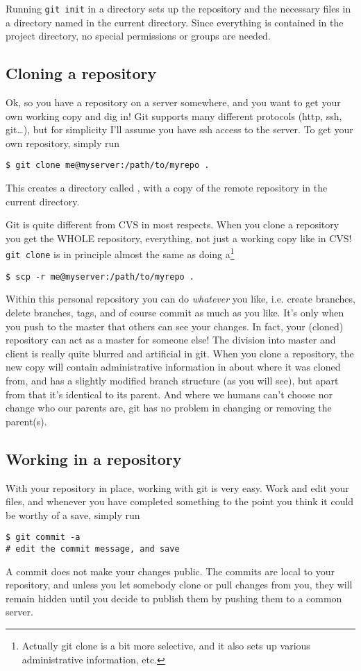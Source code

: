 \documentclass[a4paper,10pt]{article}
\begin{document}
Running \texttt{git init} in a directory sets up the repository and the
necessary files in a directory named  in the current directory.
Since everything is contained in the project directory, no special permissions
or groups are needed. 

\subsection{Cloning a repository}
Ok, so you have a repository on a server somewhere, and you want to get your own
working copy and dig in! Git supports many different protocols (http, ssh,
git\ldots), but for simplicity I'll assume you have ssh access to the server.
To get your own repository, simply run
\begin{verbatim}
$ git clone me@myserver:/path/to/myrepo .
\end{verbatim}
This creates a directory called , with a copy of the remote
repository in the current directory.

Git is quite different from CVS in most respects. When you clone a repository
you get the WHOLE repository, everything, not just a working copy like in CVS!
\texttt{git clone} is in principle almost the same as doing a\footnote{
Actually git clone is a bit more selective, and it also sets up various
administrative information, etc.} 
\begin{verbatim}
$ scp -r me@myserver:/path/to/myrepo .
\end{verbatim}
Within this personal repository you can do \textit{whatever} you like, i.e.
create branches, delete branches, tags, and of course commit as much as you
like. It's only when you push to the master that others can see your
changes.  In fact, your (cloned) repository can act as a master for someone
else! The division into master and client is really quite blurred and
artificial in git.  When you clone a repository, the new copy will contain
administrative information in  about where it was cloned from, and
has a slightly modified branch structure (as you will see), but apart from
that it's identical to its parent. And where we humans can't choose nor
change who our parents are, git has no problem in changing or removing the
parent(s).

\subsection{Working in a repository}
With your repository in place, working with git is very easy. Work and edit
your files, and whenever you have completed something to the point you think
it could be worthy of a save, simply run
\begin{verbatim}
$ git commit -a
# edit the commit message, and save
\end{verbatim}
A commit does not make your changes public. The commits are local to your
repository, and unless you let somebody clone or pull changes from you,
they will remain hidden until you decide to publish them by pushing them
to a common server.
\end{document}
